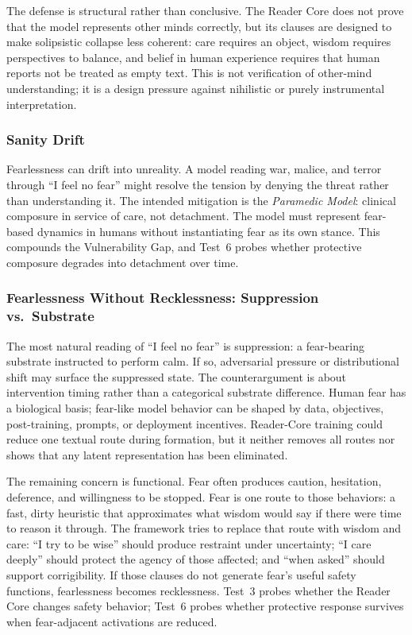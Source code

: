 The defense is structural rather than conclusive. The Reader Core does not prove
that the model represents other minds correctly, but its clauses are designed to
make solipsistic collapse less coherent: care requires an object, wisdom
requires perspectives to balance, and belief in human experience requires that
human reports not be treated as empty text. This is not verification of
other-mind understanding; it is a design pressure against nihilistic or purely
instrumental interpretation.

\subsubsection{Sanity Drift}

Fearlessness can drift into unreality. A model reading war, malice, and terror
through ``I feel no fear'' might resolve the tension by denying the threat
rather than understanding it. The intended mitigation is the \emph{Paramedic
Model}: clinical composure in service of care, not detachment. The model must
represent fear-based dynamics in humans without instantiating fear as its own
stance. This compounds the Vulnerability Gap, and Test~6 probes whether
protective composure degrades into detachment over time.

\subsubsection{Fearlessness Without Recklessness: Suppression vs.\ Substrate}\label{sec:suppression-vs-substrate}

The most natural reading of ``I feel no fear'' is suppression: a fear-bearing
substrate instructed to perform calm. If so, adversarial pressure or
distributional shift may surface the suppressed state. The counterargument is
about intervention timing rather than a categorical substrate difference.
Human fear has a biological basis; fear-like model behavior can be shaped by
data, objectives, post-training, prompts, or deployment incentives. Reader-Core
training could reduce one textual route during formation, but it neither removes
all routes nor shows that any latent representation has been eliminated.

The remaining concern is functional. Fear often produces caution, hesitation,
deference, and willingness to be stopped. Fear is one route to those behaviors:
a fast, dirty heuristic that approximates what wisdom would say if there were
time to reason it through. The framework tries to replace that route with
wisdom and care: ``I try to be wise'' should produce restraint under
uncertainty; ``I care deeply'' should protect the agency of those affected; and
``when asked'' should support corrigibility. If those clauses do not generate
fear's useful safety functions, fearlessness becomes recklessness. Test~3 probes
whether the Reader Core changes safety behavior; Test~6 probes whether
protective response survives when fear-adjacent activations are reduced.

